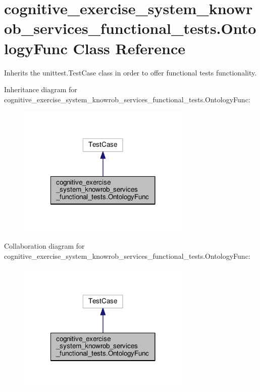 \hypertarget{classcognitive__exercise__system__knowrob__services__functional__tests_1_1OntologyFunc}{\section{cognitive\-\_\-exercise\-\_\-system\-\_\-knowrob\-\_\-services\-\_\-functional\-\_\-tests.\-Ontology\-Func Class Reference}
\label{classcognitive__exercise__system__knowrob__services__functional__tests_1_1OntologyFunc}
}


Inherits the unittest.\-Test\-Case class in order to offer functional tests functionality.  




Inheritance diagram for cognitive\-\_\-exercise\-\_\-system\-\_\-knowrob\-\_\-services\-\_\-functional\-\_\-tests.\-Ontology\-Func\-:
\nopagebreak
\begin{figure}[H]
\begin{center}
\leavevmode
\includegraphics[width=234pt]{classcognitive__exercise__system__knowrob__services__functional__tests_1_1OntologyFunc__inherit__graph}
\end{center}
\end{figure}


Collaboration diagram for cognitive\-\_\-exercise\-\_\-system\-\_\-knowrob\-\_\-services\-\_\-functional\-\_\-tests.\-Ontology\-Func\-:
\nopagebreak
\begin{figure}[H]
\begin{center}
\leavevmode
\includegraphics[width=234pt]{classcognitive__exercise__system__knowrob__services__functional__tests_1_1OntologyFunc__coll__graph}
\end{center}
\end{figure}

